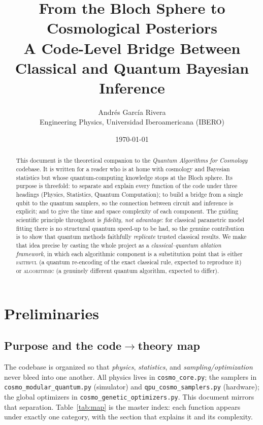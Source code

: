 \documentclass[11pt]{article}
\title{\bfseries From the Bloch Sphere to Cosmological Posteriors\\[2pt]
\large A Code-Level Bridge Between Classical and Quantum Bayesian Inference}
\author{Andr\'es Garc\'ia Rivera\\
\small Engineering Physics, Universidad Iberoamericana (IBERO)}
\date{\today}
\newcommand{\code}[1]{\texttt{#1}}
\newcommand{\faithful}{\textsc{faithful}}
\newcommand{\algorithmic}{\textsc{algorithmic}}
\begin{document}
\maketitle

\begin{abstract}
\noindent
This document is the theoretical companion to the \emph{Quantum Algorithms
for Cosmology} codebase. It is written for a reader who is at home with
cosmology and Bayesian statistics but whose quantum-computing knowledge stops
at the Bloch sphere. Its purpose is threefold: to separate and explain every
function of the code under three headings (Physics, Statistics, Quantum
Computation); to build a bridge from a single qubit to the quantum samplers,
so the connection between circuit and inference is explicit; and to give the
time and space complexity of each component. The guiding scientific principle
throughout is \emph{fidelity, not advantage}: for classical parametric model
fitting there is no structural quantum speed-up to be had, so the genuine
contribution is to show that quantum methods faithfully \emph{replicate}
trusted classical results. We make that idea precise by casting the whole
project as a \emph{classical--quantum ablation framework}, in which each
algorithmic component is a substitution point that is either \faithful{}
(a quantum re-encoding of the exact classical rule, expected to reproduce it)
or \algorithmic{} (a genuinely different quantum algorithm, expected to
differ).
\end{abstract}

\tableofcontents
\newpage

\section{Preliminaries}

\subsection{Purpose and the code\texorpdfstring{$\to$}{->}theory map}

The codebase is organized so that \emph{physics}, \emph{statistics}, and
\emph{sampling/optimization} never bleed into one another. All physics lives
in \code{cosmo\_core.py}; the samplers in \code{cosmo\_modular\_quantum.py}
(simulator) and \code{qpu\_cosmo\_samplers.py} (hardware); the global
optimizers in \code{cosmo\_genetic\_optimizers.py}. This document mirrors that
separation. Table~\ref{tab:map} is the master index: each function appears
under exactly one category, with the section that explains it and its
complexity.
\end{document}
